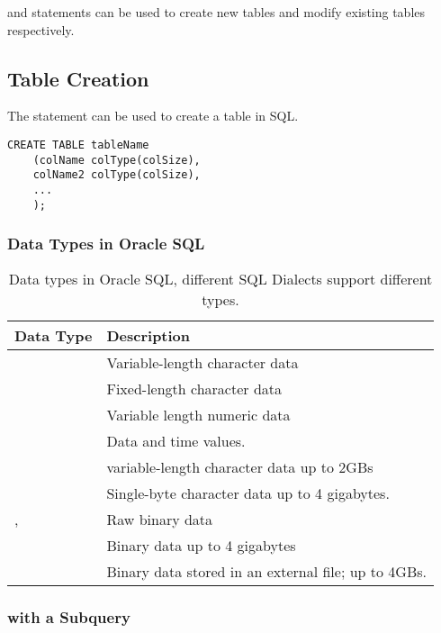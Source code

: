 \documentclass[11pt,a4paper,twocolumn]{book}
\begin{document}
 and  statements can be used to create new tables and modify existing tables respectively.

\subsection{Table Creation}

The  statement can be used to create a table in SQL.

\begin{lstlisting}
CREATE TABLE tableName
	(colName colType(colSize),
	colName2 colType(colSize),
	...
	);
\end{lstlisting}

\subsubsection{Data Types in Oracle SQL}

\begin{table}[h]
    \centering
    \begin{tabular}{l L{6cm}}
		Data Type & Description\\
        \toprule
         & Variable-length character data\\
         & Fixed-length character data\\
         & Variable length numeric data\\
         & Data and time values.\\
         & variable-length character data up to 2GBs\\
         & Single-byte character data up to 4 gigabytes.\\
        ,  & Raw binary data\\
         & Binary data up to 4 gigabytes\\
         & Binary data stored in an external file; up to 4GBs.\\
        \bottomrule
    \end{tabular}
    \caption{Data types in Oracle SQL, different SQL Dialects support different types.}
    \label{tab:datatypes}
\end{table}

\subsubsection{ with a Subquery}
\end{document}

